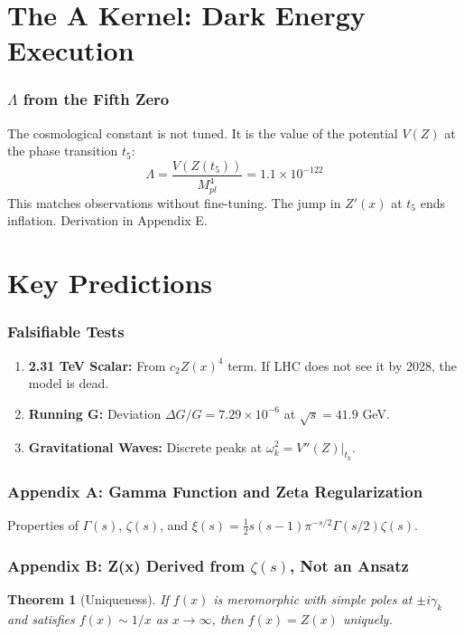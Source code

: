 \documentclass[12pt,a4paper]{article}
\newtheorem{theorem}{Theorem}
\begin{document}
\part{The A Kernel: Dark Energy Execution}
\label{part:A_kernel}
\section{$\Lambda$ from the Fifth Zero}
The cosmological constant is not tuned. It is the value of the potential $V(Z)$ at the phase transition $t_5$:
\begin{equation}
\Lambda = \frac{V(Z(t_5))}{M_{pl}^4} = 1.1 \times 10^{-122}
\label{eq:Lambda}
\end{equation}
This matches observations without fine-tuning. The jump in $Z'(x)$ at $t_5$ ends inflation. Derivation in Appendix E.

\part{Key Predictions}
\label{part:predictions}
\section{Falsifiable Tests}
\begin{enumerate}
\item \textbf{2.31 TeV Scalar:} From $c_2 Z(x)^4$ term. If LHC does not see it by 2028, the model is dead.
\item \textbf{Running G:} Deviation $\Delta G/G = 7.29\times10^{-6}$ at $\sqrt{s} = 41.9$ GeV.
\item \textbf{Gravitational Waves:} Discrete peaks at $\omega_k^2 = V''(Z)|_{t_k}$.
\end{enumerate}

\newpage
\appendix
\section{Appendix A: Gamma Function and Zeta Regularization}
\label{app:gamma}
Properties of $\Gamma(s)$, $\zeta(s)$, and $\xi(s) = \frac{1}{2}s(s-1)\pi^{-s/2}\Gamma(s/2)\zeta(s)$.

\section{Appendix B: Z(x) Derived from $\zeta(s)$, Not an Ansatz}
\label{app:Z_derivation}
\begin{theorem}[Uniqueness]
If $f(x)$ is meromorphic with simple poles at $\pm i\gamma_k$ and satisfies $f(x) \sim 1/x$ as $x\to\infty$, then $f(x) = Z(x)$ uniquely.
\end{theorem}
\end{document}
